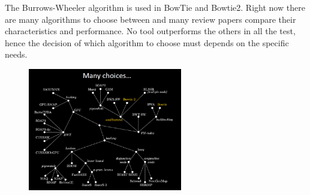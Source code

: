 The Burrows-Wheeler algorithm is used in BowTie and Bowtie2. 
Right now there are many algorithms to choose between and many review papers compare their characteristics and performance. No tool outperforms the others in all the test, hence the decision of which algorithm to choose must depends on the specific needs. 

\begin{figure}[h]
\centering
\includegraphics[width=0.6\textwidth]{Choices.png}
\caption{}
\end{figure}
